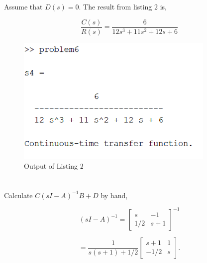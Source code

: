 \documentclass[12pt]{article}
\numberwithin{equation}{section}
\begin{document}
  \newpage
  \section{}

  Assume that $ D(s) = 0. $ The result from listing 2 is,

  \begin{equation}
    \frac{C(s)}{R(s)} = \frac{6}{12s^3 + 11s^2 + 12s + 6}
  \end{equation}

  \newpage

  

  \begin{figure}
    \centering
    \includegraphics[width=0.85\textwidth]{figures/problem6output}
    \caption{Output of Listing 2}
    \label{fig:problem6output}
  \end{figure}

  \newpage

  \section{}

  Calculate $ C \left( sI - A \right)^{-1}B + D $ by hand,

  \[
      (sI - A)^{-1} =
      \begin{bmatrix}
        s & -1 \\
        1/2 & s + 1
      \end{bmatrix}^{-1}
    \]

  \[
      = \frac{1}{s(s + 1) + 1/2}
      \begin{bmatrix}
        s + 1 & 1 \\
        -1/2 & s
      \end{bmatrix}
    .\]
\end{document}
